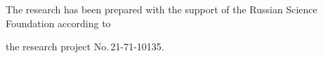 


















\vspace*{-12pt}





\Ack





\vspace*{-4pt}





\noindent


The research has been prepared with the support of the Russian Science Foundation according to


the research project No.\,21-71-10135. 











